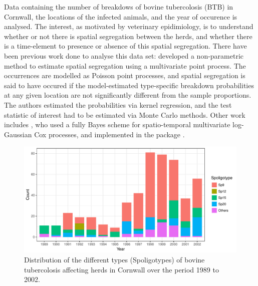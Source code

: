 \documentclass[a4paper,showframe,11pt]{report}\usepackage[]{graphicx}\usepackage[]{color}
\newenvironment{knitrout}{}{} %
\begin{document}
Data containing the number of breakdows of bovine tubercolosis (BTB) in Cornwall, the locations of the infected animals, and the year of occurence is analysed.
The interest, as motivated by veterinary epidimiology, is to understand whether or not there is spatial segregation between the herds, and whether there is a time-element to presence or absence of this spatial segregation.
There have been previous work done to analyse this data set: \cite{diggle2005nonparametric} developed a non-parametric method to estimate spatial segregation using a multivariate point process.
The occurrences are modelled as Poisson point processes, and spatial segregation is said to have occured if the model-estimated type-specific breakdown probabilities at any given location are not significantly different from the sample proportions.
The authors estimated the probabilities via kernel regression, and the test statistic of interest had to be estimated via Monte Carlo methods.
Other work includes \citet{diggle2013spatial}, who used a fully Bayes scheme for spatio-temporal multivariate log-Gaussian Cox processes, and implemented in the  package  \citep{taylor2013lgcp}.

\begin{knitrout}
\color{fgcolor}\begin{figure}[htb]

{\centering \includegraphics[width=\linewidth]{figure/05-plot_cow-1} 

}

\caption[Distribution of the different types (Spoligotypes) of bovine tubercolosis affecting herds in Cornwall over the period 1989 to 2002]{Distribution of the different types (Spoligotypes) of bovine tubercolosis affecting herds in Cornwall over the period 1989 to 2002.}\label{fig:plot.cow}
\end{figure}


\end{knitrout}
\end{document}
